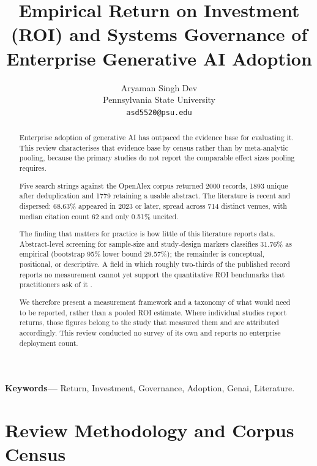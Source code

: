 \documentclass[10pt,journal,compsoc,twocolumn]{IEEEtran}
\begin{document}
\title{Empirical Return on Investment (ROI) and Systems Governance of Enterprise Generative AI Adoption}

\author{
Aryaman Singh Dev\\
Pennsylvania State University \\
\texttt{asd5520@psu.edu}
}

\maketitle

\begin{abstract}
Enterprise adoption of generative AI has outpaced the evidence base for evaluating it. This review characterises that evidence base by census rather than by meta-analytic pooling, because the primary studies do not report the comparable effect sizes pooling requires.

Five search strings against the OpenAlex corpus returned 2000 records, 1893 unique after deduplication and 1779 retaining a usable abstract. The literature is recent and dispersed: 68.63\% appeared in 2023 or later, spread across 714 distinct venues, with median citation count 62 and only 0.51\% uncited.

The finding that matters for practice is how little of this literature reports data. Abstract-level screening for sample-size and study-design markers classifies 31.76\% as empirical (bootstrap 95\% lower bound 29.57\%); the remainder is conceptual, positional, or descriptive. A field in which roughly two-thirds of the published record reports no measurement cannot yet support the quantitative ROI benchmarks that practitioners ask of it \cite{crossref_10_2139_ssrn_6374778}.

We therefore present a measurement framework and a taxonomy of what would need to be reported, rather than a pooled ROI estimate. Where individual studies report returns, those figures belong to the study that measured them and are attributed accordingly. This review conducted no survey of its own and reports no enterprise deployment count.
\end{abstract}

\noindent\textbf{Keywords---} Return, Investment, Governance, Adoption, Genai, Literature.





\section{Review Methodology and Corpus Census}
\end{document}
